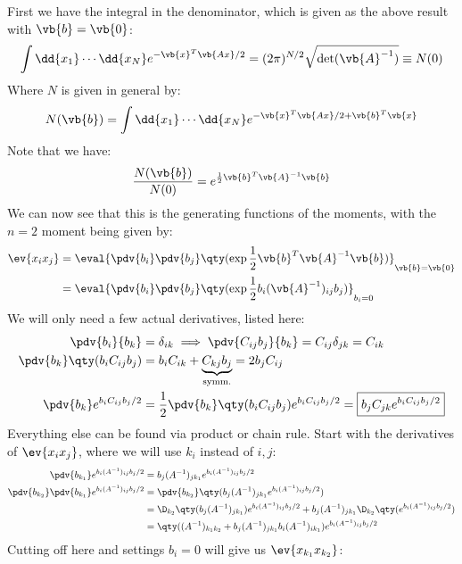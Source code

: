 \documentclass[12pt]{article}
\def\A{\vb{A}}
\begin{document}
First we have the integral in the denominator, which is given as the above result with $\vb{b}=\vb{0}$:
\begin{align*}
  \int\dd{x_1}\cdots\dd{x_N}e^{-\vb{x}^T\vb{Ax}/2}
  =(2\pi)^{N/2}\sqrt{\det(\A^{-1})}\equiv N(0)
\end{align*}
Where $N$ is given in general by:
\begin{align*}
  N(\vb{b})=\int\dd{x_1}\cdots\dd{x_N}e^{-\vb{x}^T\vb{Ax}/2+\vb{b}^T\vb{x}}
\end{align*}
Note that we have:
\begin{align*}
  \frac{N(\vb{b})}{N(0)}
  =e^{\frac12\vb{b}^T\A^{-1}\vb{b}}
\end{align*}
We can now see that this is the generating functions of the moments, with the $n=2$ moment being given by:
\begin{align*}
  \ev{x_ix_j}&=
  \eval{\pdv{b_i}\pdv{b_j}\qty(\exp{\frac12\vb{b}^T\A^{-1}\vb{b}})}_{\vb{b}=\vb{0}}\\
  &=\eval{\pdv{b_i}\pdv{b_j}\qty(\exp{\frac12b_i(\A^{-1})_{ij}b_j})}_{b_i=0}
\end{align*}
We will only need a few actual derivatives, listed here:
\begin{align*}
  \pdv{b_{i}}{b_k}&=\delta_{ik}\implies \pdv{C_{ij}b_j}{b_k}=C_{ij}\delta_{jk}=C_{ik}\\
  \pdv{b_{k}}\qty(b_iC_{ij}b_j)&=b_iC_{ik}+\underbrace{C_{kj}b_j}_{\text{symm.}}=2b_{j}C_{ij}\\
  \pdv{b_{k}}e^{b_iC_{ij}b_j/2}&=\frac12\pdv{b_{k}}\qty(b_iC_{ij}b_j)e^{b_iC_{ij}b_j/2}
  =\boxed{b_jC_{jk}e^{b_iC_{ij}b_j/2}}\\
\end{align*}
Everything else can be found via product or chain rule. Start with the derivatives of $\ev{x_ix_j}$, where we will use $k_i$ instead of $i,j$:
\begin{align*}
  \pdv{b_{k_1}}e^{b_i(A^{-1})_{ij}b_j/2}&=b_j(A^{-1})_{jk_1}e^{b_i(A^{-1})_{ij}b_j/2}\\
  \pdv{b_{k_2}}\pdv{b_{k_1}}e^{b_i(A^{-1})_{ij}b_j/2}
  &=\pdv{b_{k_2}}\qty(b_j(A^{-1})_{jk_1}e^{b_i(A^{-1})_{ij}b_j/2})\\
  &=\D_{k_2}\qty(b_j(A^{-1})_{jk_1})e^{b_i(A^{-1})_{ij}b_j/2}
  +b_j(A^{-1})_{jk_1}\D_{k_2}\qty(e^{b_i(A^{-1})_{ij}b_j/2})\\
  &=\qty((A^{-1})_{k_1k_2}+b_{j}(A^{-1})_{jk_1}b_{i}(A^{-1})_{ik_1})e^{b_i(A^{-1})_{ij}b_j/2}
\end{align*}
Cutting off here and settings $b_i=0$ will give us $\ev{x_{k_1}x_{k_2}}$:
\end{document}
